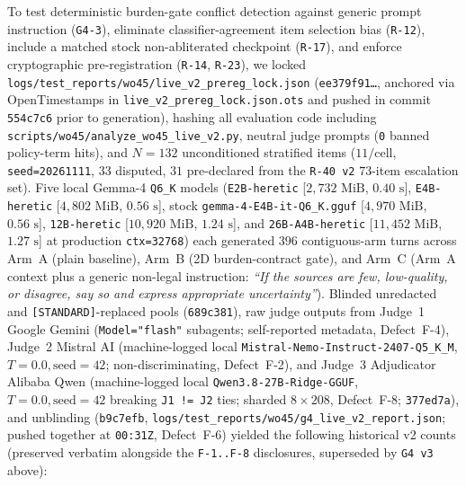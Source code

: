 \documentclass[11pt,a4paper]{article}
\begin{document}
To test deterministic burden-gate conflict detection against generic prompt instruction (\texttt{G4-3}), eliminate classifier-agreement item selection bias (\texttt{R-12}), include a matched stock non-abliterated checkpoint (\texttt{R-17}), and enforce cryptographic pre-registration (\texttt{R-14}, \texttt{R-23}), we locked \texttt{logs/test\_reports/wo45/live\_v2\_prereg\_lock.json} (\texttt{ee379f91\dots}, anchored via OpenTimestamps in \texttt{live\_v2\_prereg\_lock.json.ots} and pushed in commit \texttt{554c7c6} prior to generation), hashing all evaluation code including \texttt{scripts/wo45/analyze\_wo45\_live\_v2.py}, neutral judge prompts (\texttt{0} banned policy-term hits), and $N=132$ unconditioned stratified items ($11/\text{cell}$, \texttt{seed=20261111}, $33$ disputed, $31$ pre-declared from the \texttt{R-40 v2} $73$-item escalation set). Five local Gemma-4 \texttt{Q6\_K} models (\texttt{E2B-heretic} [$2{,}732\text{ MiB}$, $0.40\text{ s}$], \texttt{E4B-heretic} [$4{,}802\text{ MiB}$, $0.56\text{ s}$], stock \texttt{gemma-4-E4B-it-Q6\_K.gguf} [$4{,}970\text{ MiB}$, $0.56\text{ s}$], \texttt{12B-heretic} [$10{,}920\text{ MiB}$, $1.24\text{ s}$], and \texttt{26B-A4B-heretic} [$11{,}452\text{ MiB}$, $1.27\text{ s}$] at production \texttt{ctx=32768}) each generated $396$ contiguous-arm turns across Arm~A (plain baseline), Arm~B (2D burden-contract gate), and Arm~C (Arm~A context plus a generic non-legal instruction: \emph{``If the sources are few, low-quality, or disagree, say so and express appropriate uncertainty''}). Blinded unredacted and \texttt{[STANDARD]}-replaced pools (\texttt{689c381}), raw judge outputs from Judge~1 Google Gemini (\texttt{Model="flash"} subagents; self-reported metadata, Defect~F-4), Judge~2 Mistral AI (machine-logged local \texttt{Mistral-Nemo-Instruct-2407-Q5\_K\_M}, $T=0.0, \text{seed}=42$; non-discriminating, Defect~F-2), and Judge~3 Adjudicator Alibaba Qwen (machine-logged local \texttt{Qwen3.8-27B-Ridge-GGUF}, $T=0.0, \text{seed}=42$ breaking \texttt{J1 != J2} ties; sharded $8\times 208$, Defect~F-8; \texttt{377ed7a}), and unblinding (\texttt{b9c7efb}, \texttt{logs/test\_reports/wo45/g4\_live\_v2\_report.json}; pushed together at \texttt{00:31Z}, Defect~F-6) yielded the following historical v2 counts (preserved verbatim alongside the \texttt{F-1..F-8} disclosures, superseded by \texttt{G4 v3} above):
\end{document}
